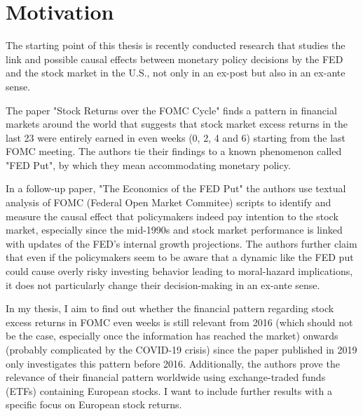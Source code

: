 
\chapter{Motivation}

The starting point of this thesis is recently conducted research that studies the link and possible causal effects between monetary policy decisions by the FED and the stock market in the U.S., not only in an ex-post but also in an ex-ante sense.

The paper "Stock Returns over the FOMC Cycle" \parencite{cieslak_stock_2019} finds a pattern in financial markets around the world that suggests that stock market excess returns in the last 23 were entirely earned in even weeks (0, 2, 4 and 6) starting from the last FOMC meeting. The authors tie their findings to a known phenomenon called "FED Put", by which they mean accommodating monetary policy.

In a follow-up paper, "The Economics of the FED Put" \parencite{cieslak_economics_2021} the authors use textual analysis of FOMC (Federal Open Market Commitee) scripts to identify and measure the causal effect that policymakers indeed pay intention to the stock market, especially since the mid-1990s and stock market performance is linked with updates of the FED’s internal growth projections.  The authors further claim that even if the policymakers seem to be aware that a dynamic like the FED put could cause overly risky investing behavior leading to moral-hazard implications,  it does not particularly change their decision-making in an ex-ante sense.

In my thesis,  I aim to find out whether the financial pattern regarding stock excess returns in FOMC even weeks is still relevant from 2016 (which should not be the case, especially once the information has reached the market) onwards (probably complicated by the COVID-19 crisis) since the paper published in 2019 only investigates this pattern before 2016. Additionally, the authors prove the relevance of their financial pattern worldwide using exchange-traded funds (ETFs) containing European stocks. I want to include further results with a specific focus on European stock returns.


